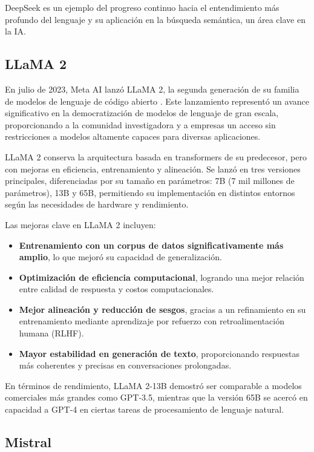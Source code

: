 DeepSeek es un ejemplo del progreso continuo hacia el entendimiento más profundo del lenguaje y su aplicación en la búsqueda semántica, un área clave en la IA.


\subsection{LLaMA 2}

En julio de 2023, Meta AI lanzó LLaMA 2, la segunda generación de su familia de modelos de lenguaje de código abierto \cite{touvron2023llama2openfoundation}. 
Este lanzamiento representó un avance significativo en la democratización de modelos de lenguaje de gran escala, proporcionando a la comunidad investigadora y a empresas un acceso sin restricciones a modelos altamente capaces para diversas aplicaciones.

LLaMA 2 conserva la arquitectura basada en transformers de su predecesor, pero con mejoras en eficiencia, entrenamiento y alineación. 
Se lanzó en tres versiones principales, diferenciadas por su tamaño en parámetros: 7B (7 mil millones de parámetros), 13B y 65B, permitiendo su implementación en distintos entornos según las necesidades de hardware y rendimiento.

Las mejoras clave en LLaMA 2 incluyen:
\begin{itemize}
    \item \textbf{Entrenamiento con un corpus de datos significativamente más amplio}, lo que mejoró su capacidad de generalización.
    \item \textbf{Optimización de eficiencia computacional}, logrando una mejor relación entre calidad de respuesta y costos computacionales.
    \item \textbf{Mejor alineación y reducción de sesgos}, gracias a un refinamiento en su entrenamiento mediante aprendizaje por refuerzo con retroalimentación humana (RLHF).
    \item \textbf{Mayor estabilidad en generación de texto}, proporcionando respuestas más coherentes y precisas en conversaciones prolongadas.
\end{itemize}

En términos de rendimiento, LLaMA 2-13B demostró ser comparable a modelos comerciales más grandes como GPT-3.5, mientras que la versión 65B se acercó en capacidad a GPT-4 en ciertas tareas de procesamiento de lenguaje natural.

\subsection{Mistral}

